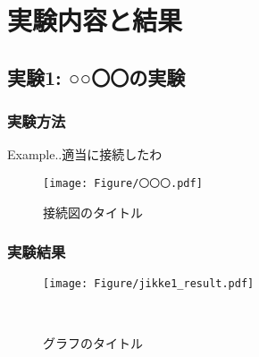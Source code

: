 \clearpage
\section{実験内容と結果}
  \subsection{実験1: ○○〇〇の実験}
  \subsubsection{実験方法}
  Example..適当に接続したわ

    \begin{figure}[htbp]
    \centering
    \texttt{[image: Figure/〇〇〇.pdf]}
    \caption{接続図のタイトル}
    \end{figure}

  

  \clearpage
  \subsubsection{実験結果}
  

  
  \begin{figure}[htbp]
    \centering
    \texttt{[image: Figure/jikke1\_result.pdf]}
    \caption{グラフのタイトル}
　\end{figure}


\clearpage